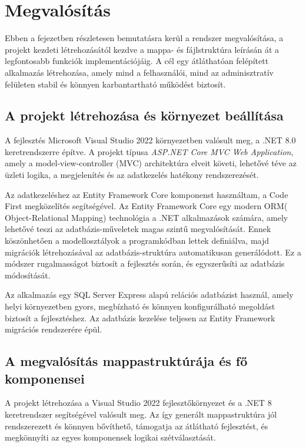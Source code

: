 \section{Megvalósítás}

Ebben a fejezetben részletesen bemutatásra kerül a rendszer megvalósítása, a projekt kezdeti létrehozásától kezdve a mappa- és fájlstruktúra leírásán át a legfontosabb funkciók implementációjáig. A cél egy átláthatóan felépített alkalmazás létrehozása, amely mind a felhasználói, mind az adminisztratív felületen stabil és könnyen karbantartható működést biztosít.

\subsection{A projekt létrehozása és környezet beállítása}

A fejlesztés Microsoft Visual Studio 2022 környezetben valósult meg, a .NET 8.0 keretrendszerre építve. A projekt típusa \textit{ASP.NET Core MVC Web Application}, amely a model-view-controller (MVC) architektúra elveit követi, lehetővé téve az üzleti logika, a megjelenítés és az adatkezelés hatékony rendszerezését.

Az adatkezeléshez az Entity Framework Core komponenst használtam, a Code First megközelítés segítségével. Az Entity Framework Core egy modern ORM( Object-Relational Mapping) technológia a .NET alkalmazások számára, amely lehetővé teszi az adatbázis-műveletek magas szintű megvalósítását. Ennek köszönhetően a modellosztályok a programkódban lettek definiálva, majd migrációk létrehozásával az adatbázis-struktúra automatikusan generálódott. Ez a módszer rugalmasságot biztosít a fejlesztés során, és egyszerűsíti az adatbázis módosítását.

Az alkalmazás egy SQL Server Express alapú relációs adatbázist használ, amely helyi környezetben gyors, megbízható és könnyen konfigurálható megoldást biztosít a fejlesztéshez. Az adatbázis kezelése teljesen az Entity Framework migrációs rendszerére épül.

\subsection{A megvalósítás mappastruktúrája és fő komponensei}

A projekt létrehozása a Visual Studio 2022 fejlesztőkörnyezet és a .NET 8 keretrendszer segítségével valósult meg. Az így generált mappastruktúra jól rendszerezett és könnyen bővíthető, támogatja az átlátható fejlesztést, és megkönnyíti az egyes komponensek logikai szétválasztását.

